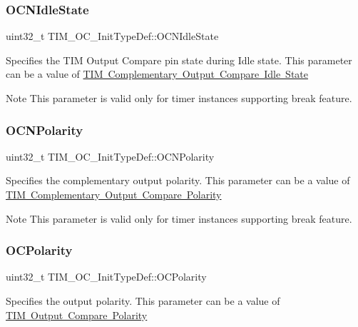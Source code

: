 \subsubsection{\texorpdfstring{OCNIdleState}{OCNIdleState}}
{\footnotesize\ttfamily uint32\+\_\+t T\+I\+M\+\_\+\+O\+C\+\_\+\+Init\+Type\+Def\+::\+O\+C\+N\+Idle\+State}

Specifies the T\+IM Output Compare pin state during Idle state. This parameter can be a value of \mbox{\hyperlink{group___t_i_m___output___compare___n___idle___state}{T\+IM Complementary Output Compare Idle State}} \begin{DoxyNote}{Note}
This parameter is valid only for timer instances supporting break feature. 
\end{DoxyNote}
\mbox{\label{struct_t_i_m___o_c___init_type_def_a21922d8e2fee659d081c4be4c500d1d4}} 
\subsubsection{\texorpdfstring{OCNPolarity}{OCNPolarity}}
{\footnotesize\ttfamily uint32\+\_\+t T\+I\+M\+\_\+\+O\+C\+\_\+\+Init\+Type\+Def\+::\+O\+C\+N\+Polarity}

Specifies the complementary output polarity. This parameter can be a value of \mbox{\hyperlink{group___t_i_m___output___compare___n___polarity}{T\+IM Complementary Output Compare Polarity}} \begin{DoxyNote}{Note}
This parameter is valid only for timer instances supporting break feature. 
\end{DoxyNote}
\mbox{\label{struct_t_i_m___o_c___init_type_def_a556b7137d041aceed3e45c87cbfb39cd}} 
\subsubsection{\texorpdfstring{OCPolarity}{OCPolarity}}
{\footnotesize\ttfamily uint32\+\_\+t T\+I\+M\+\_\+\+O\+C\+\_\+\+Init\+Type\+Def\+::\+O\+C\+Polarity}

Specifies the output polarity. This parameter can be a value of \mbox{\hyperlink{group___t_i_m___output___compare___polarity}{T\+IM Output Compare Polarity}} \mbox{\label{struct_t_i_m___o_c___init_type_def_a61fb5b9ef4154de67620ac81085a0e39}} 

